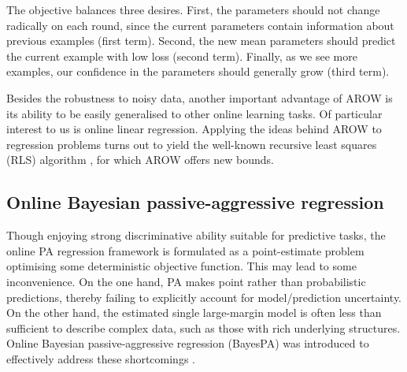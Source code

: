 The objective balances three desires. First, the parameters should not change radically on each round, since the current parameters contain information about previous examples (first term). Second, the new mean parameters should predict the current example with low loss (second term). Finally, as we see more examples, our confidence in the parameters should generally grow (third term).

Besides the robustness to noisy data, another important advantage of AROW is its ability to be easily generalised to other online learning tasks. Of particular interest to us is online linear regression. Applying the ideas behind AROW to regression problems turns out to yield the well-known recursive least squares (RLS) algorithm \citep{haykin}, for which AROW offers new bounds.


\subsection{Online Bayesian passive-aggressive regression}

Though enjoying strong discriminative ability suitable for predictive tasks, the online PA regression framework is formulated as a point-estimate problem optimising some deterministic objective function. This may lead to some inconvenience. On the one hand, PA makes point rather than probabilistic predictions, thereby failing to explicitly account for model/prediction uncertainty. On the other hand, the estimated single large-margin model is often less than sufficient to describe complex data, such as those with rich underlying structures. Online Bayesian passive-aggressive regression (BayesPA) was introduced to effectively address these shortcomings \citep{bayespa}.

